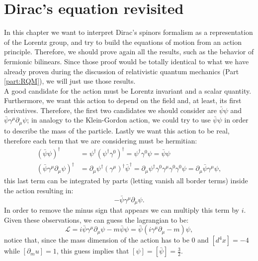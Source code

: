 \section{Dirac's equation revisited}
In this chapter we want to interpret Dirac's spinors formalism as a representation of the Lorentz group, and try to build the equations of motion from an action principle. Therefore, we should prove again all the results, such as the behavior of fermionic bilinears. Since those proof would be totally identical to what we have already proven during the discussion of relativistic quantum mechanics (Part \ref{part:RQM}), we will just use those results.\\

A good candidate for the action must be Lorentz invariant and a scalar quantity. Furthermore, we want this action to depend on the field and, at least, its first derivatives. Therefore, the first two candidates we should consider are $\bar\psi\psi$ and $\bar\psi\gamma^\mu\partial_\mu\psi$; in analogy to the Klein-Gordon action, we could try to use $\bar\psi\psi$ in order to describe the mass of the particle. Lastly we want this action to be real, therefore each term that we are considering must be hermitian:
\begin{align*}
    (\bar\psi\psi)^\dagger&=\psi^\dagger(\psi^\dagger\gamma^0)^\dagger=\psi^\dagger\gamma^0\psi=\bar\psi\psi\\
    (\bar\psi\gamma^\mu\partial_\mu\psi)^\dagger&=\partial_\mu\psi^\dagger(\gamma^\mu)^\dagger\bar\psi^\dagger=\partial_\mu\psi^\dagger\gamma^0\gamma^\mu\gamma^0\gamma^0\psi=\partial_\mu\bar\psi\gamma^\mu\psi,
\end{align*}
this last term can be integrated by parts (letting vanish all border terms) inside the action resulting in:
\begin{equation*}
    -\bar\psi\gamma^\mu\partial_\mu\psi.
\end{equation*}
In order to remove the minus sign that appears we can multiply this term by $i$. \\

Given these observations, we can guess the lagrangian to be:
\begin{equation}\label{DiracLagRev}
    \mathcal{L} =i\bar\psi\gamma^\mu\partial_\mu\psi-m\bar\psi\psi=\bar\psi(i\gamma^\mu\partial_\mu-m)\psi,
\end{equation}
notice that, since the mass dimension of the action has to be $0$ and $[d^4x]=-4$ while $[\partial_mu]=1$, this guess implies that $[\psi]=[\bar\psi]=\frac{3}{2}$.\\

